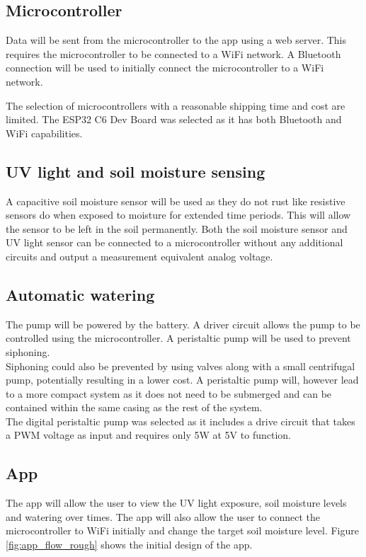 \subsection{Microcontroller}
Data will be sent from the microcontroller to the app using a web server. This requires the microcontroller to be connected to a WiFi network. A Bluetooth connection will be used to initially connect the microcontroller to a WiFi network.

The selection of microcontrollers with a reasonable shipping time and cost are limited. The ESP32 C6 Dev Board was selected as it has both Bluetooth and WiFi capabilities.


\subsection{UV light and soil moisture sensing}
A capacitive soil moisture sensor will be used as they do not rust like resistive sensors do when exposed to moisture for extended time periods. This will allow the sensor to be left in the soil permanently. Both the soil moisture sensor and UV light sensor can be connected to a microcontroller without any additional circuits and output a measurement equivalent analog voltage. 

\subsection{Automatic watering}
The pump will be powered by the battery. A driver circuit allows the pump to be controlled using the microcontroller. A peristaltic pump will be used to prevent siphoning. \\

Siphoning could also be prevented by using valves along with a small centrifugal pump, potentially resulting in a lower cost. A peristaltic pump will, however lead to a more compact system as it does not need to be submerged and can be contained within the same casing as the rest of the system. \\

The digital peristaltic pump was selected as it includes a drive circuit that takes a PWM voltage as input and requires only 5W at 5V to function.

\subsection{App}
The app will allow the user to view the UV light exposure, soil moisture levels and watering over times. The app will also allow the user to connect the microcontroller to WiFi initially and change the target soil moisture level. Figure \ref{fig:app_flow_rough} shows the initial design of the app. 

